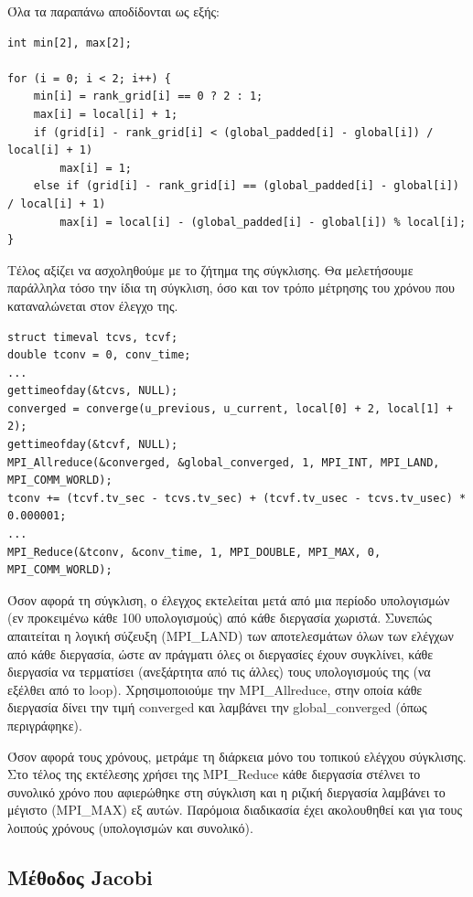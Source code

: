 \documentclass[12pt,titlepage]{article}
\begin{document}
Όλα τα παραπάνω αποδίδονται ως εξής:

\begin{verbatim}
int min[2], max[2];

for (i = 0; i < 2; i++) {
    min[i] = rank_grid[i] == 0 ? 2 : 1;
    max[i] = local[i] + 1;
    if (grid[i] - rank_grid[i] < (global_padded[i] - global[i]) / local[i] + 1)
        max[i] = 1;
    else if (grid[i] - rank_grid[i] == (global_padded[i] - global[i]) / local[i] + 1)
        max[i] = local[i] - (global_padded[i] - global[i]) % local[i];
}
\end{verbatim}

Τέλος αξίζει να ασχοληθούμε με το ζήτημα της σύγκλισης. Θα μελετήσουμε παράλληλα
τόσο την ίδια τη σύγκλιση, όσο και τον τρόπο μέτρησης του χρόνου που
καταναλώνεται στον έλεγχο της.

\begin{verbatim}
struct timeval tcvs, tcvf;
double tconv = 0, conv_time;
...
gettimeofday(&tcvs, NULL);
converged = converge(u_previous, u_current, local[0] + 2, local[1] + 2);
gettimeofday(&tcvf, NULL);
MPI_Allreduce(&converged, &global_converged, 1, MPI_INT, MPI_LAND, MPI_COMM_WORLD);
tconv += (tcvf.tv_sec - tcvs.tv_sec) + (tcvf.tv_usec - tcvs.tv_usec) * 0.000001;
...
MPI_Reduce(&tconv, &conv_time, 1, MPI_DOUBLE, MPI_MAX, 0, MPI_COMM_WORLD);
\end{verbatim}

Όσον αφορά τη σύγκλιση, ο έλεγχος εκτελείται μετά από μια περίοδο υπολογισμών
(εν προκειμένω κάθε 100 υπολογισμούς) από κάθε διεργασία χωριστά. Συνεπώς
απαιτείται η λογική σύζευξη (MPI\_LAND) των αποτελεσμάτων όλων των ελέγχων από
κάθε διεργασία, ώστε αν πράγματι όλες οι διεργασίες έχουν συγκλίνει, κάθε
διεργασία να τερματίσει (ανεξάρτητα από τις άλλες) τους υπολογισμούς της (να
εξέλθει από το loop). Χρησιμοποιούμε την MPI\_Allreduce, στην οποία κάθε
διεργασία δίνει την τιμή converged και λαμβάνει την global\_converged (όπως
περιγράφηκε).

Όσον αφορά τους χρόνους, μετράμε τη διάρκεια μόνο του τοπικού ελέγχου σύγκλισης.
Στο τέλος της εκτέλεσης χρήσει της MPI\_Reduce κάθε διεργασία στέλνει το
συνολικό χρόνο που αφιερώθηκε στη σύγκλιση και η ριζική διεργασία λαμβάνει το
μέγιστο (MPI\_MAX) εξ αυτών. Παρόμοια διαδικασία έχει ακολουθηθεί και για τους
λοιπούς χρόνους (υπολογισμών και συνολικό).

\subsection{Μέθοδος Jacobi}
\end{document}
